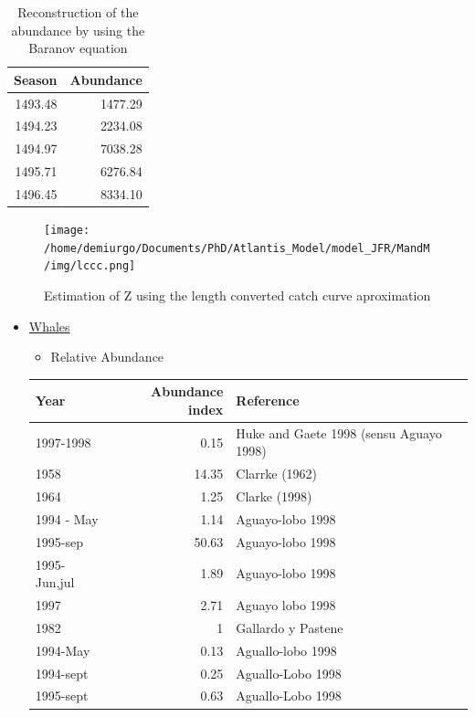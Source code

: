 \documentclass[11pt]{article}
\begin{document}
\begin{itemize}
\begin{table}[htb]
\caption{Reconstruction of the abundance by using the Baranov equation}
\begin{center}
\begin{tabular}{rr}
  Season  &  Abundance  \\
\hline
 1493.48  &    1477.29  \\
 1494.23  &    2234.08  \\
 1494.97  &    7038.28  \\
 1495.71  &    6276.84  \\
 1496.45  &    8334.10  \\
\end{tabular}
\end{center}
\end{table}


          \begin{figure}[htb]
          \centering
          \texttt{[image: /home/demiurgo/Documents/PhD/Atlantis\_Model/model\_JFR/MandM/img/lccc.png]}
          \caption{Estimation of Z using the length converted catch curve aproximation}
          \end{figure}

\begin{itemize}
\item \underline{Whales}
\begin{itemize}
\item Relative Abundance
\end{itemize}

\begin{center}
\begin{tabular}{lrl}
 Year          &  Abundance index  &  Reference                                \\
\hline
 1997-1998     &             0.15  &  Huke and Gaete 1998 (sensu Aguayo 1998)  \\
 1958          &            14.35  &  Clarrke (1962)                           \\
 1964          &             1.25  &  Clarke (1998)                            \\
 1994 - May    &             1.14  &  Aguayo-lobo 1998                         \\
 1995-sep      &            50.63  &  Aguayo-lobo 1998                         \\
 1995-Jun,jul  &             1.89  &  Aguayo-lobo 1998                         \\
 1997          &             2.71  &  Aguayo lobo 1998                         \\
 1982          &                1  &  Gallardo y Pastene                       \\
 1994-May      &             0.13  &  Aguallo-lobo 1998                        \\
 1994-sept     &             0.25  &  Aguallo-Lobo 1998                        \\
 1995-sept     &             0.63  &  Aguallo-Lobo 1998                        \\
\end{tabular}
\end{center}



\end{itemize}
\end{itemize}
\end{document}
